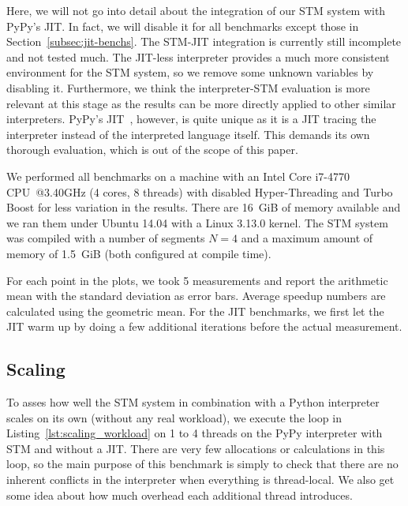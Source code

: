 \documentclass{sigplanconf}
\begin{document}
Here, we will not go into detail about the integration of our STM
system with PyPy's JIT. In fact, we will disable it for all benchmarks
except those in Section~\ref{subsec:jit-benchs}. The STM-JIT
integration is currently still incomplete and not tested much. The
JIT-less interpreter provides a much more consistent environment for
the STM system, so we remove some unknown variables by disabling it.
Furthermore, we think the interpreter-STM evaluation is more relevant
at this stage as the results can be more directly applied to other
similar interpreters. PyPy's JIT~\cite{cfbolz09}, however, is quite
unique as it is a JIT tracing the interpreter instead of the
interpreted language itself. This demands its own thorough
evaluation, which is out of the scope of this paper.


We performed all benchmarks on a machine with an Intel Core i7-4770
CPU~@3.40GHz (4 cores, 8 threads) with disabled Hyper-Threading and
Turbo Boost for less variation in the results.  There are 16~GiB of memory
available and we ran them under Ubuntu 14.04 with a Linux 3.13.0
kernel. The STM system was compiled with a number of segments $N=4$
and a maximum amount of memory of 1.5~GiB (both configured at
compile time).

For each point in the plots, we took 5 measurements and report the
arithmetic mean with the standard deviation as error bars. Average
speedup numbers are calculated using the geometric mean. For the JIT
benchmarks, we first let the JIT warm up by doing a few additional
iterations before the actual measurement.



\subsection{Scaling}

To asses how well the STM system in combination with a Python
interpreter scales on its own (without any real workload), we execute
the loop in Listing~\ref{lst:scaling_workload} on 1 to 4 threads on
the PyPy interpreter with STM and without a JIT.  There are very few
allocations or calculations in this loop, so the main purpose of this
benchmark is simply to check that there are no inherent conflicts in
the interpreter when everything is thread-local. We also get some
idea about how much overhead each additional thread introduces.
\end{document}
